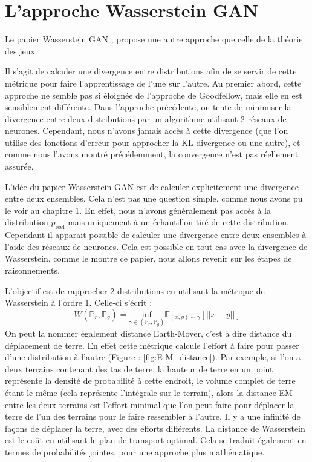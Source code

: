 \section{L'approche Wasserstein GAN}

Le papier Wasserstein GAN \cite{arjovsky_wasserstein_2017}, propose une autre approche que celle de la théorie des jeux.

Il s'agit de calculer une divergence entre distributions afin de se servir de cette métrique pour faire l'apprentissage de l'une sur l'autre. Au premier abord, cette approche ne semble pas si éloignée de l'approche de Goodfellow, mais elle en est sensiblement différente. Dans l'approche précédente, on tente de minimiser la divergence entre deux distributions par un algorithme utilisant 2 réseaux de neurones. Cependant, nous n'avons jamais accès à cette divergence (que l'on utilise des fonctions d'erreur pour approcher la KL-divergence ou une autre), et comme nous l'avons montré précédemment, la convergence n'est pas réellement assurée. 

L'idée du papier Wasserstein GAN est de calculer explicitement une divergence entre deux ensembles. Cela n'est pas une question simple, comme nous avons pu le voir au chapitre 1. En effet, nous n'avons généralement pas accès à la distribution $p_{\text{réel}}$ mais uniquement à un échantillon tiré de cette distribution. \\ Cependant il apparait possible de calculer une divergence entre deux ensembles à l'aide des réseaux de neurones. Cela est possible en tout cas avec la divergence de Wasserstein, comme le montre ce papier, nous allons revenir sur les étapes de raisonnements.

L'objectif est de rapprocher 2 distributions en utilisant la métrique de Wasserstein à l'ordre 1. Celle-ci s'écrit :
\[
W(\mathbb{P}_r, \mathbb{P}_g)= \underset{\gamma \in (\mathbb{P}_r, \mathbb{P}_g)}{\text{inf}} \mathbb{E}_{(x,y)\sim\gamma} \left[ ||x-y||\right]
\]
On peut la nommer également distance Earth-Mover, c'est à dire distance du déplacement de terre. En effet cette métrique calcule l'effort à faire pour passer d'une distribution à l'autre (Figure : \ref{fig:E-M_distance}). Par exemple, si l'on a deux terrains contenant des tas de terre, la hauteur de terre en un point représente la densité de probabilité à cette endroit, le volume complet de terre étant le même (cela représente l'intégrale sur le terrain), alors la distance EM entre les deux terrains est l'effort minimal que l'on peut faire pour déplacer la terre de l'un des terrains pour le faire ressembler à l'autre. Il y a une infinité de façons de déplacer la terre, avec des efforts différents. La distance de Wasserstein est le coût en utilisant le plan de transport optimal. Cela se traduit également en termes de probabilités jointes, pour une approche plus mathématique. 

